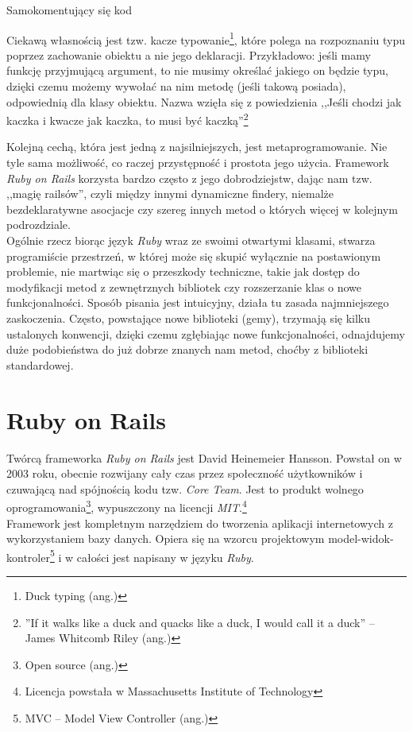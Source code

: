 \documentclass[12pt,twoside]{report}
\begin{document}
\begin{listing}
  
  \caption{Samokomentujący się kod}
  \label{listing:selfcommenting}
\end{listing}


Ciekawą własnością jest tzw. kacze typowanie\footnote{Duck typing (ang.)}, które polega na
rozpoznaniu typu poprzez zachowanie obiektu a nie jego deklaracji. Przykładowo: jeśli mamy
funkcję przyjmującą argument, to nie musimy określać jakiego on będzie typu, dzięki czemu
możemy wywołać na nim metodę (jeśli takową posiada), odpowiednią dla klasy obiektu. Nazwa
wzięła się z powiedzienia ,,Jeśli chodzi jak kaczka i kwacze jak kaczka, to musi być
kaczką''\footnote{''If it walks like a duck and quacks like a duck, I would call it a duck''
-- James Whitcomb Riley (ang.)}


Kolejną cechą, która jest jedną z najsilniejszych, jest metaprogramowanie. Nie tyle sama
możliwość, co raczej przystępność i prostota jego użycia. Framework \emph{Ruby on Rails}
korzysta bardzo często z jego dobrodziejstw, dając nam tzw. ,,magię railsów'', czyli
między innymi dynamiczne findery, niemalże bezdeklaratywne asocjacje czy szereg innych
metod o których więcej w kolejnym podrozdziale.\\
Ogólnie rzecz biorąc język \emph{Ruby} wraz ze swoimi otwartymi klasami, stwarza
programiście przestrzeń, w której może się skupić wyłącznie na postawionym problemie, nie
martwiąc się o przeszkody techniczne, takie jak dostęp do modyfikacji metod z zewnętrznych
bibliotek czy rozszerzanie klas o nowe funkcjonalności. Sposób pisania jest intuicyjny,
działa tu zasada najmniejszego zaskoczenia. Często, powstające nowe biblioteki (gemy), trzymają
się kilku ustalonych konwencji, dzięki czemu zgłębiając nowe funkcjonalności, odnajdujemy
duże podobieństwa do już dobrze znanych nam metod, choćby z biblioteki standardowej.


\section{Ruby on Rails}
Twórcą frameworka \emph{Ruby on Rails} jest David Heinemeier Hansson. Powstał on w 2003
roku, obecnie rozwijany cały czas przez społeczność użytkowników i czuwającą nad
spójnością kodu tzw. \emph{Core Team}. Jest to produkt wolnego
oprogramowania\footnote{Open source (ang.)}, wypuszczony na licencji
\emph{MIT}.\footnote{Licencja powstała w Massachusetts Institute of Technology}\\
Framework jest kompletnym narzędziem do tworzenia aplikacji internetowych z wykorzystaniem
bazy danych. Opiera się na wzorcu projektowym model-widok-kontroler\footnote{MVC -- Model View
Controller (ang.)} i w całości jest napisany w języku \emph{Ruby}.
\end{document}
